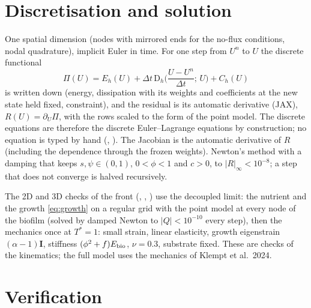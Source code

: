 \documentclass[11pt,a4paper]{article}
\newcommand{\D}{\mathrm{D}}
\begin{document}
\section{Discretisation and solution}

One spatial dimension (nodes with mirrored ends for the no-flux conditions, nodal quadrature),
implicit Euler in time. For one step from $U^n$ to $U$ the discrete functional
\[\Pi(U)=E_h(U)+\Delta t\,\D_h\Big(\frac{U-U^n}{\Delta t};\,U\Big)+C_h(U)\]
is written down (energy, dissipation with its weights and coefficients at the new state held
fixed, constraint), and the residual is its automatic derivative (JAX), $R(U)=\partial_U\Pi$,
with the rows scaled to the form of the point model. The discrete equations are therefore the
discrete Euler--Lagrange equations by construction; no equation is typed by hand
(, ). The Jacobian is the
automatic derivative of $R$ (including the dependence through the frozen weights). Newton's
method with a damping that keeps $s,\psi\in(0,1)$, $0<\phi<1$ and $c>0$, to
$|R|_\infty<10^{-8}$; a step that does not converge is halved recursively.

The 2D and 3D checks of the front (, ,
) use the decoupled limit: the nutrient and the growth
\eqref{eq:growth} on a regular grid with the point model at every node of the biofilm (solved by
damped Newton to $|Q|<10^{-10}$ every step), then the mechanics once at $T^*=1$: small strain,
linear elasticity, growth eigenstrain $(\alpha-1)\mathbf I$, stiffness $(\phi^2+f)E_{\rm bio}$,
$\nu=0.3$, substrate fixed. These are checks of the kinematics; the full model uses the
mechanics of Klempt et al.\ 2024.

\section{Verification}
\end{document}
